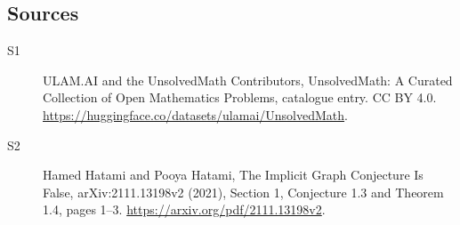 \documentclass[11pt]{article}
\begin{document}
\subsection{Sources}
\begin{description}
\item[\hypertarget{source:statement:1}{S1}] ULAM.AI and the UnsolvedMath Contributors, UnsolvedMath: A Curated Collection of Open Mathematics Problems, catalogue entry. CC BY 4.0. \url{https://huggingface.co/datasets/ulamai/UnsolvedMath}.
\item[\hypertarget{source:statement:2}{S2}] Hamed Hatami and Pooya Hatami, The Implicit Graph Conjecture Is False, arXiv:2111.13198v2 (2021), Section 1, Conjecture 1.3 and Theorem 1.4, pages 1--3. \url{https://arxiv.org/pdf/2111.13198v2}.
\end{description}
\label{end:statement}
\end{document}

